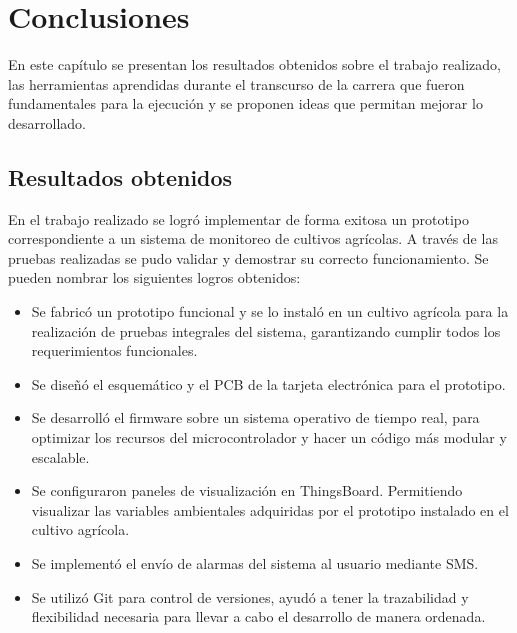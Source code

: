 
\chapter{Conclusiones} %
En este capítulo se presentan los resultados obtenidos sobre el trabajo realizado, las herramientas aprendidas durante el transcurso de la carrera que fueron fundamentales para la ejecución y se proponen ideas que permitan mejorar lo desarrollado.
\label{Chapter5} %

  

 
\section{Resultados obtenidos}
En el trabajo realizado se logró implementar de forma exitosa un prototipo correspondiente a un sistema de monitoreo de cultivos agrícolas. A través de las pruebas realizadas se pudo validar y demostrar su correcto funcionamiento.
Se pueden nombrar los siguientes logros obtenidos:
\begin{itemize}
\item Se fabricó un prototipo funcional y se lo instaló en un cultivo agrícola para la realización de pruebas integrales del sistema, garantizando cumplir todos los requerimientos funcionales.
\item Se diseñó el esquemático y el PCB de la tarjeta electrónica para el prototipo.
\item Se desarrolló el firmware sobre un sistema operativo de tiempo real, para optimizar los recursos del microcontrolador y hacer un código más modular y escalable.
\item Se configuraron paneles de visualización en ThingsBoard. Permitiendo visualizar las variables ambientales adquiridas por el prototipo instalado en el  cultivo agrícola.
\item Se implementó el envío de alarmas del sistema al usuario mediante SMS.
\item Se utilizó Git para control de versiones, ayudó a tener la trazabilidad y flexibilidad necesaria para llevar a cabo el desarrollo de manera ordenada.
\end{itemize}

